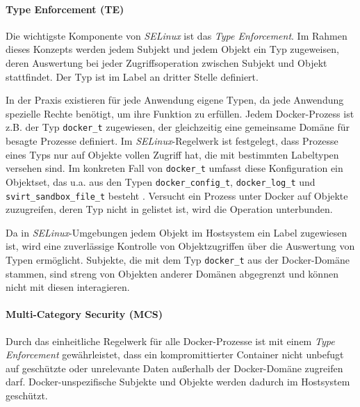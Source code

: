 \documentclass[../main.tex]{subfiles}
\begin{document}

				\paragraph{Type Enforcement (TE)}
					Die wichtigste Komponente von \emph{SELinux} ist das \emph{Type Enforcement}. Im Rahmen dieses Konzepts werden jedem Subjekt und jedem Objekt ein Typ zugeweisen, deren Auswertung bei jeder Zugriffsoperation zwischen Subjekt und Objekt stattfindet. Der Typ ist im Label an dritter Stelle definiert.

					In der Praxis existieren für jede Anwendung eigene Typen, da jede Anwendung spezielle Rechte benötigt, um ihre Funktion zu erfüllen. Jedem Docker-Prozess ist z.B. der Typ \texttt{docker\_t} zugewiesen, der gleichzeitig eine gemeinsame Domäne für besagte Prozesse definiert. Im \emph{SELinux}-Regelwerk ist festgelegt, dass Prozesse eines Typs nur auf Objekte vollen Zugriff hat, die mit bestimmten Labeltypen versehen sind. Im konkreten Fall von \texttt{docker\_t} umfasst diese Konfiguration ein Objektset, das u.a. aus den Typen \texttt{docker\_config\_t}, \texttt{docker\_log\_t} und \texttt{svirt\_sandbox\_file\_t} besteht \cite{githubSELinuxProfileTE}. Versucht ein Prozess unter Docker auf Objekte zuzugreifen, deren Typ nicht in \cite{githubSELinuxProfileTE} gelistet ist, wird die Operation unterbunden.

					Da in \emph{SELinux}-Umgebungen jedem Objekt im Hostsystem ein Label zugewiesen ist, wird eine zuverlässige Kontrolle von Objektzugriffen über die Auswertung von Typen ermöglicht. Subjekte, die mit dem Typ \texttt{docker\_t} aus der Docker-Domäne stammen, sind streng von Objekten anderer Domänen abgegrenzt und können nicht mit diesen interagieren.

				\paragraph{Multi-Category Security (MCS)}
					Durch das einheitliche Regelwerk für alle Docker-Prozesse ist mit einem \emph{Type Enforcement} gewährleistet, dass ein kompromittierter Container \cbroken{} nicht unbefugt auf geschützte oder unrelevante Daten außerhalb der Docker-Domäne  zugreifen darf. Docker-unspezifische Subjekte und Objekte werden dadurch im Hostsystem geschützt.
\end{document}
